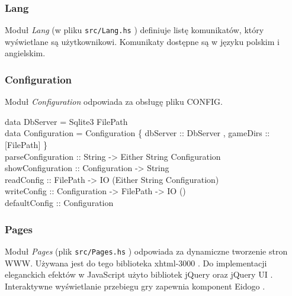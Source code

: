 \documentclass[10pt,leqno]{article}
\newcommand{\cmd}[1]{
  \texttt{#1}
}
\begin{document}
\subsubsection{Lang}
Moduł \emph{Lang} (w pliku \cmd{src/Lang.hs}) definiuje listę komunikatów, który
wyświetlane są użytkownikowi. Komunikaty dostępne są w języku polskim i angielskim.

\subsubsection{Configuration}
Moduł \emph{Configuration} odpowiada za obsługę pliku CONFIG.

\begin{framed}
\noindent data DbServer = Sqlite3 FilePath \\                       
data Configuration = Configuration \{ dbServer :: DbServer , gameDirs :: [FilePath] \} \\

\noindent parseConfiguration :: String -> Either String Configuration \\
showConfiguration :: Configuration -> String \\ 
readConfig :: FilePath -> IO (Either String Configuration) \\
writeConfig :: Configuration -> FilePath -> IO () \\
defaultConfig :: Configuration

\end{framed}


\subsubsection{Pages}
Moduł \emph{Pages} (plik \cmd{src/Pages.hs}) odpowiada za dynamiczne tworzenie stron WWW. Używana
jest do tego biblioteka xhtml-3000 \cite{xhtml}. Do implementacji eleganckich efektów w JavaScript
użyto bibliotek jQuery \cite{jquery} oraz jQuery UI \cite{jqueryui}. Interaktywne wyświetlanie 
przebiegu gry zapewnia komponent Eidogo \cite{eidogo}.
\end{document}
